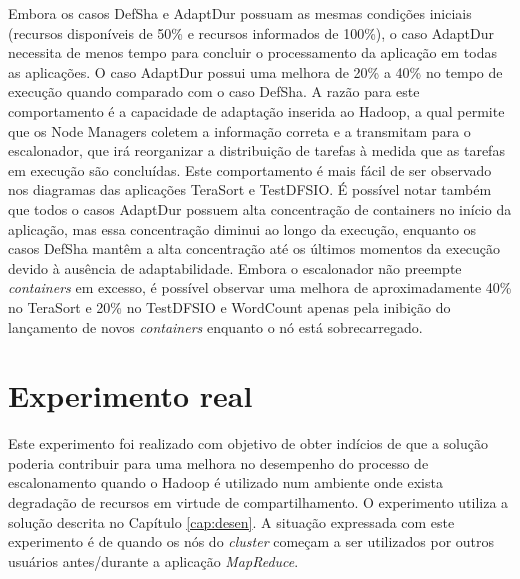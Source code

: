 Embora os casos DefSha e AdaptDur possuam as mesmas condições iniciais (recursos disponíveis de 50\% e recursos informados de 100\%), o caso AdaptDur necessita de menos tempo para concluir o processamento da aplicação em todas as aplicações. O caso AdaptDur possui uma melhora de 20\% a 40\% no tempo de execução quando comparado com o caso DefSha. A razão para este comportamento é a capacidade de adaptação inserida ao Hadoop, a qual permite que os Node Managers coletem a informação correta e a transmitam para o escalonador, que irá reorganizar a distribuição de tarefas à medida que as tarefas em execução são concluídas. Este comportamento é mais fácil de ser observado nos diagramas das aplicações TeraSort e TestDFSIO. É possível notar também que todos o casos AdaptDur possuem alta concentração de containers no início da aplicação, mas essa concentração diminui ao longo da execução, enquanto os casos DefSha mantêm a alta concentração até os últimos momentos da execução devido à ausência de adaptabilidade. Embora o escalonador não preempte \textit{containers} em excesso, é possível observar uma melhora de aproximadamente 40\% no TeraSort e 20\% no TestDFSIO e WordCount apenas pela inibição do lançamento de novos \textit{containers} enquanto o nó está sobrecarregado.



\section{Experimento real}
\label{sec:expReal}
Este experimento foi realizado com objetivo de obter indícios de que a solução poderia contribuir para uma melhora no desempenho do processo de escalonamento quando o Hadoop é utilizado num ambiente onde exista degradação de recursos em virtude de compartilhamento. O experimento utiliza a solução descrita no Capítulo \ref{cap:desen}. A situação expressada com este experimento é de quando os nós do \textit{cluster} começam a ser utilizados por outros usuários antes/durante a aplicação \textit{MapReduce}.

